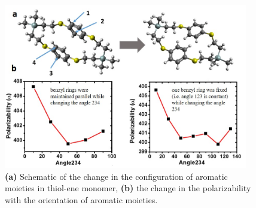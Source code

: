 \begin{figure}[htbp] 
	\centering
	\includegraphics[width=0.95\textwidth]{Appendix-B/Figures/geom_dep.jpg}
	\caption{\textbf{(a)} Schematic of the change in the configuration of aromatic moieties in thiol-ene monomer, \textbf{(b)} the change in the polarizability with the orientation of aromatic moieties.} 
	\label{fig:geom_dep} 
\end{figure}


